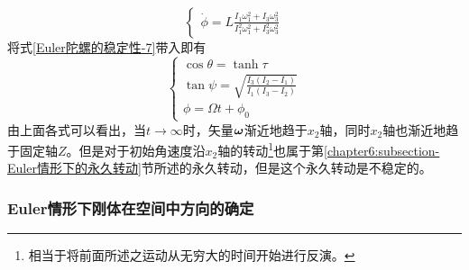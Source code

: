 \begin{enumerate}
\begin{equation}
\begin{cases}
	\displaystyle \dot{\phi} = L\frac{I_1\omega_1^2+I_3\omega_3^2}{I_1^2\omega_1^2+I_3^2\omega_3^2}
\end{cases}
\label{非对称Euler陀螺自由转动特殊情形-1}
\end{equation}
将式\eqref{Euler陀螺的稳定性-7}带入即有
\begin{equation}
\begin{cases}
	\displaystyle \cos\theta = \tanh \tau \\
	\displaystyle \tan\psi = \sqrt{\frac{I_3(I_2-I_1)}{I_1(I_3-I_2)}} \\
	\displaystyle \phi = \varOmega t+\phi_0
\end{cases}
\end{equation}
由上面各式可以看出，当$t\to \infty$时，矢量$\boldsymbol{\omega}$渐近地趋于$x_2$轴，同时$x_2$轴也渐近地趋于固定轴$Z$。但是对于初始角速度沿$x_2$轴的转动\footnote{相当于将前面所述之运动从无穷大的时间开始进行反演。}也属于第\ref{chapter6:subsection-Euler情形下的永久转动}节所述的永久转动，但是这个永久转动是不稳定的。
\end{enumerate}

\subsubsection{Euler情形下刚体在空间中方向的确定}\label{chapter6:subsubsection-Euler情形下刚体在空间中方向的确定}

